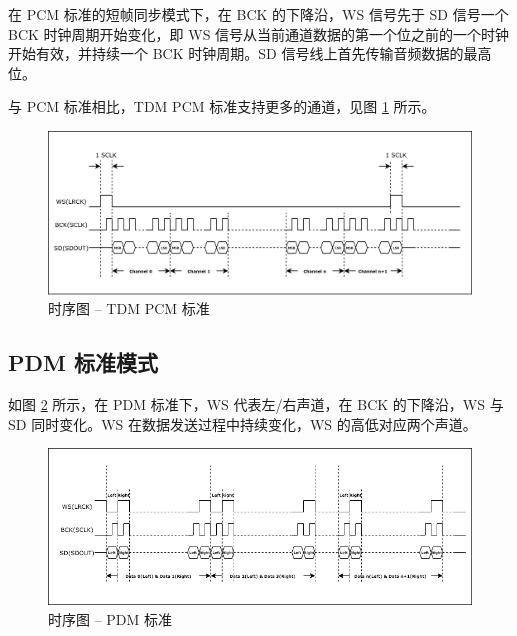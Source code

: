 \documentclass[main\_\_CN.tex]{subfiles}
\begin{document}
在 PCM 标准的短帧同步模式下，在 BCK 的下降沿，WS 信号先于 SD 信号一个 BCK 时钟周期开始变化，即 WS 信号从当前通道数据的第一个位之前的一个时钟开始有效，并持续一个 BCK 时钟周期。SD 信号线上首先传输音频数据的最高位。

与 PCM 标准相比，TDM PCM 标准支持更多的通道，见图 \ref{Figure:i2s_pcm_mode} 所示。

\begin{figure}[H]
    \centering
    \includegraphics[width=1.0\textwidth]{03-I2S/figures/i2s_tdm_pcm_mode.png}
    \caption{时序图 -- TDM PCM 标准}
    \label{Figure:i2s_pcm_mode}
\end{figure}


\subsection{PDM 标准模式}
如图 \ref{Figure:i2s_pdm_mode} 所示，在 PDM 标准下，WS 代表左/右声道，在 BCK 的下降沿，WS 与 SD 同时变化。WS 在数据发送过程中持续变化，WS 的高低对应两个声道。%

\begin{figure}[H]
    \centering
    \includegraphics[width=1.0\textwidth]{03-I2S/figures/i2s_pdm_mode.png}
    \caption{时序图 -- PDM 标准}
    \label{Figure:i2s_pdm_mode}
\end{figure}
\end{document}

